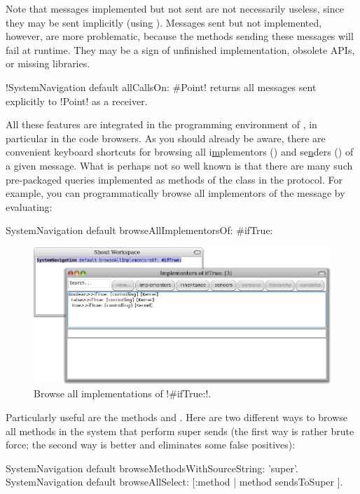 \documentclass[a4paper,10pt,twoside]{book}
\begin{document}
Note that messages implemented but not sent are not necessarily useless, since they may be sent implicitly (\eg using ).
Messages sent but not implemented, however, are more problematic, because the methods sending these messages will fail at runtime.
They may be a sign of unfinished implementation, obsolete APIs, or missing libraries.

\ct!SystemNavigation default allCallsOn: #Point! returns all messages sent explicitly to \ct!Point! as a receiver.

All these features are integrated in the programming environment of \pharo, in particular in the code browsers.
As you should already be aware, there are convenient keyboard shortcuts for browsing all i\underline{m}plementors () and se\underline{n}ders () of a given message.
What is perhaps not so well known is that there are many such pre-packaged queries implemented as methods of the  class in the  protocol.
For example, you can programmatically browse all implementors of the message  by evaluating:
\begin{code}{}
SystemNavigation default browseAllImplementorsOf: #ifTrue:
\end{code}

\begin{figure}[ht]\centering
	\includegraphics[width=\linewidth]{implementors}
	\caption{Browse all implementations of \ct!\#ifTrue:!.\label{fig:implementors}}
\end{figure}

Particularly useful are the methods  and .  Here are two different ways to browse all methods in the system that perform super sends (the first way is rather brute force; the second way is better and eliminates some false positives):
\begin{code}{}
SystemNavigation default browseMethodsWithSourceString: 'super'.
SystemNavigation default browseAllSelect: [:method | method sendsToSuper ].
\end{code}
\end{document}
